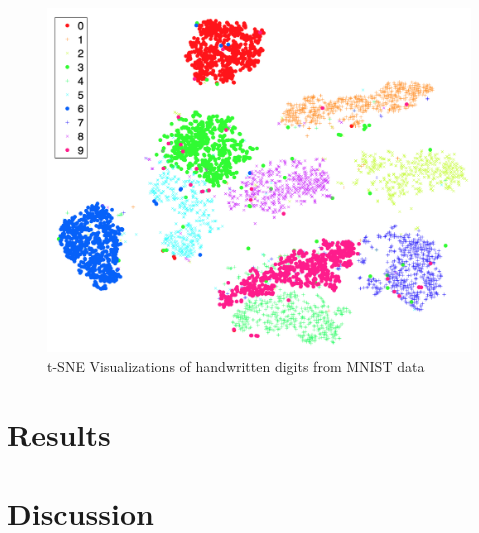\documentclass[11pt, a4paper]{article}
\begin{document}
            \begin{figure}[htbp]
                \centering
                \includegraphics[width=0.5 \linewidth]{figures/tsne.png}
                \caption{t-SNE Visualizations of handwritten digits from MNIST data \protect \cite{tsne1}}
                \label{fig:tsne}
            \end{figure}

    \section{Results}

    \section{Discussion}

    
    
\end{document}
